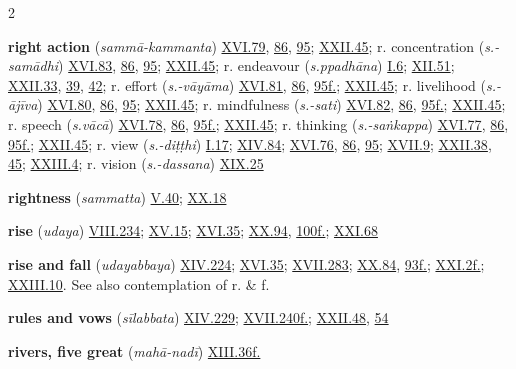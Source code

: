 \begin{multicols}{2}
\begin{vismHanging}
\par\textbf{right action} (\emph{sammā-kammanta}) \hyperlink{XVI.79}{XVI.79}{}, \hyperlink{XVI.86}{86}{}, \hyperlink{XVI.95}{95}{}; \hyperlink{XXII.45}{XXII.45}{}; r. concentration (\emph{s.-samādhi}) \hyperlink{XVI.83}{XVI.83}{}, \hyperlink{XVI.86}{86}{}, \hyperlink{XVI.95}{95}{}; \hyperlink{XXII.45}{XXII.45}{}; r. endeavour (\emph{s.ppadhāna}) \hyperlink{I.6}{I.6}{}; \hyperlink{XII.51}{XII.51}{}; \hyperlink{XXII.33}{XXII.33}{}, \hyperlink{XXII.39}{39}{}, \hyperlink{XXII.42}{42}{}; r. effort (\emph{s.-vāyāma}) \hyperlink{XVI.81}{XVI.81}{}, \hyperlink{XVI.86}{86}{}, \hyperlink{XVI.95}{95f.}{}; \hyperlink{XXII.45}{XXII.45}{}; r. livelihood (\emph{s.-ājīva}) \hyperlink{XVI.80}{XVI.80}{}, \hyperlink{XVI.86}{86}{}, \hyperlink{XVI.95}{95}{}; \hyperlink{XXII.45}{XXII.45}{}; r. mindfulness (\emph{s.-sati}) \hyperlink{XVI.82}{XVI.82}{}, \hyperlink{XVI.86}{86}{}, \hyperlink{XVI.95}{95f.}{}; \hyperlink{XXII.45}{XXII.45}{}; r. speech (\emph{s.vācā}) \hyperlink{XVI.78}{XVI.78}{}, \hyperlink{XVI.86}{86}{}, \hyperlink{XVI.95}{95f.}{}; \hyperlink{XXII.45}{XXII.45}{}; r. thinking (\emph{s.-saṅkappa}) \hyperlink{XVI.77}{XVI.77}{}, \hyperlink{XVI.86}{86}{}, \hyperlink{XVI.95}{95f.}{}; \hyperlink{XXII.45}{XXII.45}{}; r. view (\emph{s.-diṭṭhi}) \hyperlink{I.17}{I.17}{}; \hyperlink{XIV.84}{XIV.84}{}; \hyperlink{XVI.76}{XVI.76}{}, \hyperlink{XVI.86}{86}{}, \hyperlink{XVI.95}{95}{}; \hyperlink{XVII.9}{XVII.9}{}; \hyperlink{XXII.38}{XXII.38}{}, \hyperlink{XXII.45}{45}{}; \hyperlink{XXIII.4}{XXIII.4}{}; r. vision (\emph{s.-dassana}) \hyperlink{XIX.25}{XIX.25}{}
\par\textbf{rightness} (\emph{sammatta}) \hyperlink{V.40}{V.40}{}; \hyperlink{XX.18}{XX.18}{}
\par\textbf{rise} (\emph{udaya}) \hyperlink{VIII.234}{VIII.234}{}; \hyperlink{XV.15}{XV.15}{}; \hyperlink{XVI.35}{XVI.35}{}; \hyperlink{XX.94}{XX.94}{}, \hyperlink{XX.100}{100f.}{}; \hyperlink{XXI.68}{XXI.68}{}
\par\textbf{rise and fall} (\emph{udayabbaya}) \hyperlink{XIV.224}{XIV.224}{}; \hyperlink{XVI.35}{XVI.35}{}; \hyperlink{XVII.283}{XVII.283}{}; \hyperlink{XX.84}{XX.84}{}, \hyperlink{XX.93}{93f.}{}; \hyperlink{XXI.2}{XXI.2f.}{}; \hyperlink{XXIII.10}{XXIII.10}{}. See also contemplation of r. \& f. 
\par\textbf{rules and vows} (\emph{sīlabbata}) \hyperlink{XIV.229}{XIV.229}{}; \hyperlink{XVII.240}{XVII.240f.}{}; \hyperlink{XXII.48}{XXII.48}{}, \hyperlink{XXII.54}{54}{}
\par\textbf{rivers, five great} (\emph{mahā-nadī}) \hyperlink{XIII.36}{XIII.36f.}{}

\end{vismHanging}
\end{multicols}
